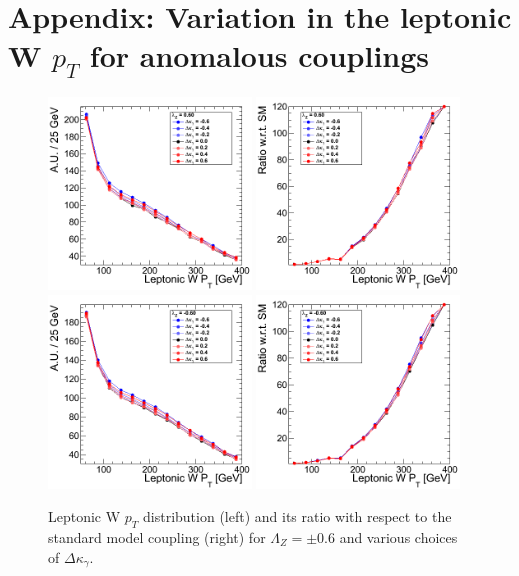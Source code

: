 \section{Appendix: Variation in the leptonic W \texorpdfstring{$p_T$}{pT} for anomalous couplings}
\begin{figure}[h!t]
  {\centering
    \includegraphics[width=0.48\textwidth]{figs/LeptonicWpT_060.png}
    \includegraphics[width=0.48\textwidth]{figs/LeptonicWpT_060_ratio.png}
    \includegraphics[width=0.48\textwidth]{figs/LeptonicWpT_m060.png}
    \includegraphics[width=0.48\textwidth]{figs/LeptonicWpT_m060_ratio.png}
    \caption{Leptonic W $p_T$ distribution (left) and its ratio with respect to 
    the standard model coupling (right) for $\Lambda_Z = \pm 0.6$ and various choices of $\Delta{\kappa_\gamma}$.}
    \label{fig:ww_LeptonicWpT_atgcRatio06}}
\end{figure}
